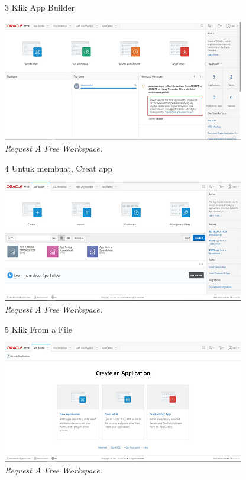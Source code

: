 \begin{enumerate}
\begin{figure}[!htbp]
\item[3]Klik App Builder

    \begin{center}
    \includegraphics[scale=0.5]{figures/2.png}
    \caption{\textit{Request A Free Workspace.}}
    \end{center}
    \end{figure}
    
\begin{figure}[!htbp]
\item[4]Untuk membuat, Creat app 

    \begin{center}
    \includegraphics[scale=0.5]{figures/3.png}
    \caption{\textit{Request A Free Workspace.}}
    \end{center}
    \end{figure}

\begin{figure}[!htbp]
\item[5]Klik From a File

    \begin{center}
    \includegraphics[scale=0.5]{figures/4.png}
    \caption{\textit{Request A Free Workspace.}}
    \end{center}
    \end{figure}
    

\end{enumerate}
